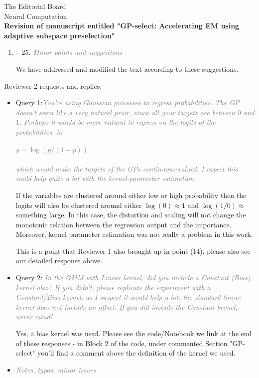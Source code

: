 \documentclass[10pt]{letter}
\newcommand{\rvr}[1]{\textcolor{gray}{#1}}
\begin{document}
\begin{letter}{
The Editorial Board\\
Neural Computation\\
\vspace{10mm}
\textbf{Revision of manuscript entitled "GP-select: Accelerating EM using adaptive
subspace preselection"}
}
\begin{enumerate}[topsep=3pt,itemsep=2ex,partopsep=1ex,parsep=1ex]
    \item -- 25. \rvr{\emph{Minor points and suggestions}}

        We have addressed and modified the text according to these suggestions. 


\end{enumerate}



Reviewer 2 requests and replies:

\begin{itemize}[topsep=3pt,itemsep=2ex,partopsep=1ex,parsep=1ex]

    \item Query 1:\rvr{\emph{You're using Gaussian processes to regress probabilities. The GP doesn't
seem like a very natural prior, since all your targets are between $0$ and
$1$. Perhaps it would be more natural to regress on the logits of the
probabilities, ie.\\
\\
$y = \log(p / (1-p))$\\
\\
which would make the targets of the GPs continuous-valued. I expect this
could help quite a bit with the kernel-parameter estimation.}}


    If the variables are clustered around either low or high probability then the logits will also be clustered around either $\log(0) \approx 1$ and $\log (1/0) \approx$ something large. In this case, the distortion and scaling will not change the monotonic relation between the regression output and the importance. Moreover, kernel parameter estimation was not really a problem in this work.

    This is a point that Reviewer 1 also brought up in point (14), please also see our detailed response above.

    \item  Query 2: \rvr{\emph{In the GMM with Linear kernel, did you include a Constant (Bias) kernel
also? If you didn't, please replicate the experiment with a Constant/Bias
kernel, as I suspect it would help a lot: the standard linear kernel does
not include an offset. If you did include the Constant kernel, never
mind!}}

    Yes, a bias kernel was used. Please see the code/Notebook we link at the end of these responses - in Block 2 of the code, under commented  Section "GP-select" you'll find a comment above the definition of the kernel we used.

    \item \rvr{\emph{Notes, typos, minor issues}}
    

\end{itemize}
\end{letter}
\end{document}
